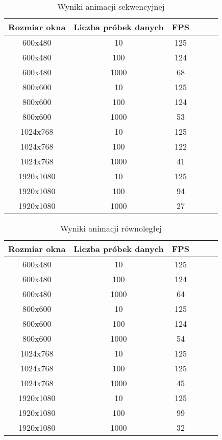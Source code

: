 \begin{table}\footnotesize
\centering
\caption{Wyniki animacji sekwencyjnej}
\label{tab:wykresy}
\begin{tabular}{|c|c|c|c|c|c|}
\hline
Rozmiar okna & Liczba próbek danych & FPS\\
\hline
600x480 & 10 & 125\\
\hline
600x480 & 100 & 124\\
\hline
600x480 & 1000 & 68\\
\hline
800x600 & 10 & 125\\
\hline
800x600 & 100 & 124\\
\hline
800x600 & 1000 & 53\\
\hline
1024x768 & 10 & 125\\
\hline
1024x768 & 100 & 122\\
\hline
1024x768 & 1000 & 41\\
\hline
1920x1080 & 10 & 125\\
\hline
1920x1080 & 100 & 94\\
\hline
1920x1080 & 1000 & 27\\
\hline
\end{tabular}
\end{table}

\begin{table}\footnotesize
\centering
\caption{Wyniki animacji równoległej}
\label{tab:wykresy}
\begin{tabular}{|c|c|c|c|c|c|}
\hline
Rozmiar okna & Liczba próbek danych & FPS\\
\hline
600x480 & 10 & 125\\
\hline
600x480 & 100 & 124\\
\hline
600x480 & 1000 & 64\\
\hline
800x600 & 10 & 125\\
\hline
800x600 & 100 & 124\\
\hline
800x600 & 1000 & 54\\
\hline
1024x768 & 10 & 125\\
\hline
1024x768 & 100 & 125\\
\hline
1024x768 & 1000 & 45\\
\hline
1920x1080 & 10 & 125\\
\hline
1920x1080 & 100 & 99\\
\hline
1920x1080 & 1000 & 32\\
\hline
\end{tabular}
\end{table}

